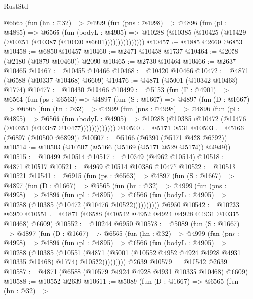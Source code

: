 \begin{lexlean}{RustStd}
\begin{coremodule}
{\begin{coremodule}
{{{{{{{{{{{{{{{{{{{{{{{{{{{{{            @6565
              (fun (hn : @32) =>
              @4999
                (fun (pns : @4998) =>
                @4896
                  (fun (pl : @4895) =>
                  @6566
                    (fun (bodyL : @4905) =>
                    @10288 (@10385 (@10425 (@10429 (@10351 (@10387 (@10430 @6601)))))))))))))))
@10457 := @1885 @2669 @6853
@10458 := @6850 @10457
@10460 := @2471 @10458 @1737
@10464 := @2058 (@2180 (@1879 @10460)) @2090
@10465 := @2730 @10464
@10466 := @2637 @10465
@10467 := @10455 @10466
@10468 := @10420 @10466
@10472 := @4871 (@6588 (@10337 @10468) @6609)
@10476 := @4871 (@5001 (@10342 @10468) @1774)
@10477 := @10430 @10466
@10499 := @5153
    (fun (Γ : @4901) =>
    @6564
      (fun (ps : @6563) =>
      @4897
        (fun (S : @1667) =>
        @4897
          (fun (D : @1667) =>
          @6565
            (fun (hn : @32) =>
            @4999
              (fun (pns : @4998) =>
              @4896
                (fun (pl : @4895) =>
                @6566
                  (fun (bodyL : @4905) =>
                  @10288 (@10385 (@10472 (@10476 (@10351 (@10387 @10477)))))))))))))
@10500 := @5171 @531
@10503 := @5166 (@6897 (@10500 @6899))
@10507 := @5166 (@6390 (@5171 @428 @6392))
@10514 := @10503 (@10507 (@5166 (@5169 (@5171 @529 @5174)) @4949))
@10515 := @10499 @10514
@10517 := @10349 (@4962 @10514)
@10518 := @4871 @10517
@10521 := @4969 @10514 @10386 @10477
@10522 := @10518 @10521
@10541 := @6915
    (fun (ps : @6563) =>
    @4897
      (fun (S : @1667) =>
      @4897
        (fun (D : @1667) =>
        @6565
          (fun (hn : @32) =>
          @4999
            (fun (pns : @4998) =>
            @4896
              (fun (pl : @4895) =>
              @6566 (fun (bodyL : @4905) => @10288 (@10385 (@10472 (@10476 @10522))))))))))
    @6950
@10542 := @10233 @6950
@10551 := @4871 (@6588 (@10542 @4952 @4924 @4928 @4931 @10335 @10468) @6609)
@10552 := @10244 @6950
@10578 := @5089
    (fun (S : @1667) =>
    @4897
      (fun (D : @1667) =>
      @6565
        (fun (hn : @32) =>
        @4999
          (fun (pns : @4998) =>
          @4896
            (fun (pl : @4895) =>
            @6566
              (fun (bodyL : @4905) =>
              @10288
                (@10385
                  (@10551
                    (@4871
                      (@5001 (@10552 @4952 @4924 @4928 @4931 @10335 @10468) @1774)
                      @10522)))))))))
    @2639
@10579 := @10542 @2639
@10587 := @4871 (@6588 (@10579 @4924 @4928 @4931 @10335 @10468) @6609)
@10588 := @10552 @2639
@10611 := @5089
    (fun (D : @1667) =>
    @6565
      (fun (hn : @32) =>
}}}}}}}}}}}}}}}}}}}}}}}}}}}}}
\end{coremodule}}
\end{coremodule}
\end{lexlean}
